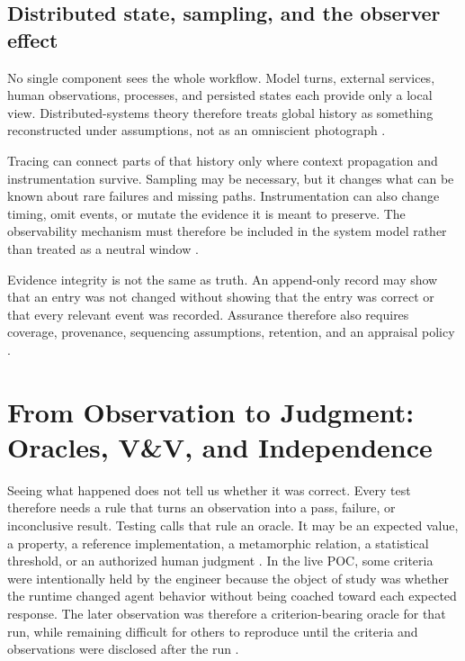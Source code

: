 \documentclass[10pt,a4paper]{article}
\begin{document}
\subsection{Distributed state, sampling, and the observer effect}

No single component sees the whole workflow. Model turns, external services, human observations, processes, and persisted states each provide only a local view. Distributed-systems theory therefore treats global history as something reconstructed under assumptions, not as an omniscient photograph \cite{lamport1978,chandy1985}.

Tracing can connect parts of that history only where context propagation and instrumentation survive. Sampling may be necessary, but it changes what can be known about rare failures and missing paths. Instrumentation can also change timing, omit events, or mutate the evidence it is meant to preserve. The observability mechanism must therefore be included in the system model rather than treated as a neutral window \cite{gait1986,dapper2010,otel,w3ctrace}.

Evidence integrity is not the same as truth. An append-only record may show that an entry was not changed without showing that the entry was correct or that every relevant event was recorded. Assurance therefore also requires coverage, provenance, sequencing assumptions, retention, and an appraisal policy \cite{nist80053,rfc9162}.

\section{From Observation to Judgment: Oracles, V\&V, and Independence}

Seeing what happened does not tell us whether it was correct. Every test therefore needs a rule that turns an observation into a pass, failure, or inconclusive result. Testing calls that rule an oracle. It may be an expected value, a property, a reference implementation, a metamorphic relation, a statistical threshold, or an authorized human judgment \cite{barr2015}. In the live POC, some criteria were intentionally held by the engineer because the object of study was whether the runtime changed agent behavior without being coached toward each expected response. The later observation was therefore a criterion-bearing oracle for that run, while remaining difficult for others to reproduce until the criteria and observations were disclosed after the run \cite{sessionrecord,caseevidence}.
\end{document}
